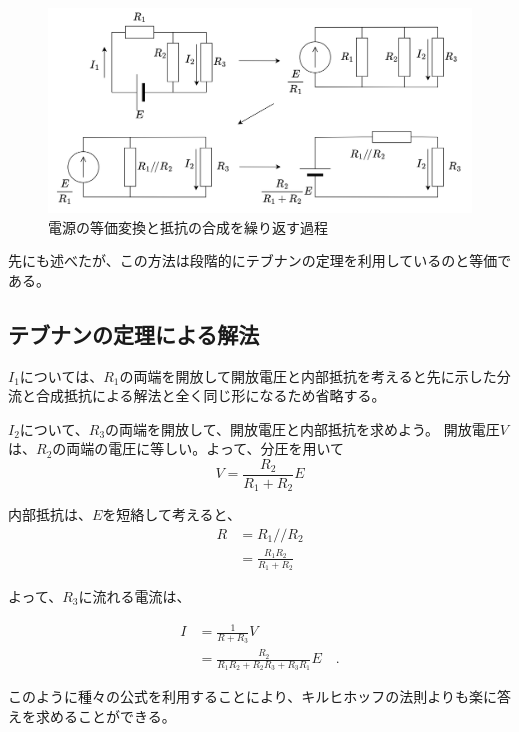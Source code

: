 \documentclass{ltjsreport}
\newcommand{\para}[2]{\frac{#1 #2}{#1 + #2}}
\newcommand{\paral}{/\!/}
\begin{document}
\begin{figure}[bth]
  \centering
  \includegraphics[keepaspectratio, scale=0.05]
       {img/loop_eqv.drawio.png}
  \caption{電源の等価変換と抵抗の合成を繰り返す過程}
  \label{fig:loop_eqv}
 \end{figure}

先にも述べたが、この方法は段階的にテブナンの定理を利用しているのと等価である。

\subsection{テブナンの定理による解法}
$I_1$については、$R_1$の両端を開放して開放電圧と内部抵抗を考えると先に示した分流と合成抵抗による解法と全く同じ形になるため省略する。

$I_2$について、$R_3$の両端を開放して、開放電圧と内部抵抗を求めよう。
開放電圧$V$は、$R_2$の両端の電圧に等しい。よって、分圧を用いて
\[
  V = \frac{R_2}{R_1+R_2}E
  \]

内部抵抗は、$E$を短絡して考えると、
\begin{align}
  R &= R_1 \paral R_2\\
    &= \para{R_1}{R_2}
\end{align}

よって、$R_3$に流れる電流は、

\begin{align}
  I &= \frac{1}{R+R_3}V\\
    &= \frac{R_2}{R_1R_2+R_2R_3+R_3R_1}E \quad .
\end{align}


このように種々の公式を利用することにより、キルヒホッフの法則よりも楽に答えを求めることができる。
\end{document}
